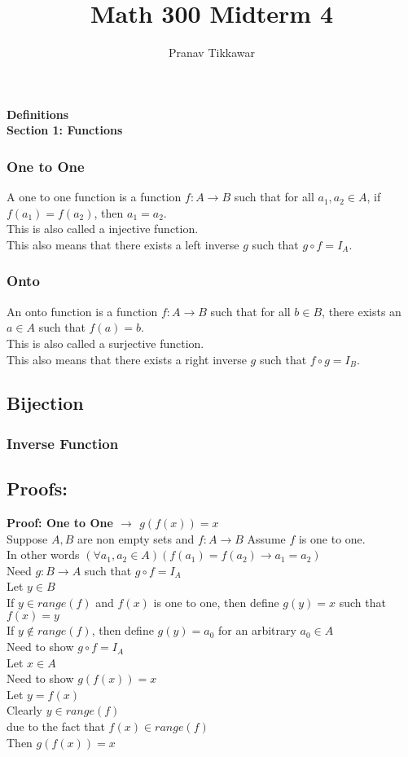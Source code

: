 \documentclass{article}
\author{Pranav Tikkawar}
\title{Math 300 Midterm 4}
\begin{document}
\maketitle
\textbf{Definitions}\\
\textbf{Section 1: Functions}
\subsubsection*{One to One}
A one to one function is a function $f:A \rightarrow B$ such that for all $a_1, a_2 \in A$, if $f(a_1) = f(a_2)$, then $a_1 = a_2$.\\
This is also called a injective function.\\
This also means that there exists a left inverse $g$ such that $g \circ f = I_A$.
\subsubsection*{Onto}
An onto function is a function $f:A \rightarrow B$ such that for all $b \in B$, there exists an $a \in A$ such that $f(a) = b$.\\
This is also called a surjective function.\\
This also means that there exists a right inverse $g$ such that $f \circ g = I_B$.
\subsection*{Bijection}

\subsubsection*{Inverse Function}

\subsection*{Proofs:}
\textbf{Proof: One to One $\rightarrow$ $g(f(x))=x$}\\
Suppose $A,B$ are non empty sets and $f:A \rightarrow B$ 
Assume $f$ is one to one.\\
In other words $(\forall a_1, a_2 \in A)(f(a_1) = f(a_2) \rightarrow a_1 = a_2)$\\
Need $g:B \rightarrow A$ such that $g \circ f = I_A$\\
Let $y \in B$\\
If $y \in range(f)$ and $f(x) $ is one to one, then define $g(y) = x$ such that $f(x) = y$\\
If $y \notin range(f)$, then define $g(y) = a_0$ for an arbitrary $a_0 \in A$\\
Need to show $g \circ f = I_A$\\
Let $x \in A$\\
Need to show $g(f(x)) = x$\\
Let $y = f(x)$\\
Clearly $y \in range(f)$\\ due to the fact that $f(x) \in range(f)$\\ 
Then $g(f(x)) = x$\\
\end{document}
